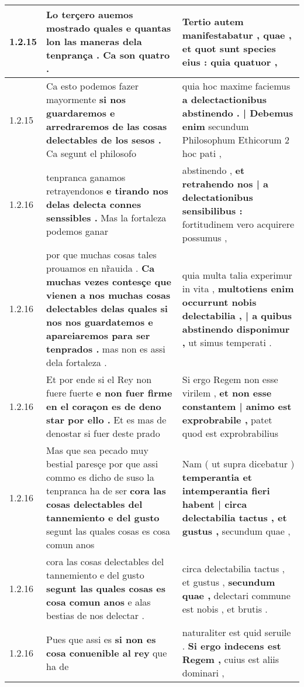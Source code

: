 \begin{tabular}{|p{1cm}|p{6.5cm}|p{6.5cm}|}
1.2.15 & Lo terçero auemos mostrado \textbf{ quales e quantas lon las maneras dela tenprança . } Ca son quatro . & Tertio autem manifestabatur , quae , \textbf{ et quot sunt species eius : } quia quatuor , \\\hline
1.2.15 & Ca esto podemos fazer mayormente \textbf{ si nos guardaremos e arredraremos de las cosas delectables de los sesos . } Ca segunt el philosofo & quia hoc maxime faciemus \textbf{ a delectactionibus abstinendo . | Debemus enim } secundum Philosophum Ethicorum 2 hoc pati , \\\hline
1.2.16 & tenpranca ganamos retrayendonos \textbf{ e tirando nos delas delecta connes senssibles . } Mas la fortaleza podemos ganar & abstinendo , \textbf{ et retrahendo nos | a delectationibus sensibilibus : } fortitudinem vero acquirere possumus , \\\hline
1.2.16 & por que muchas cosas tales prouamos en nr̃auida . \textbf{ Ca muchas vezes contesçe que vienen a nos muchas cosas delectables delas quales si nos nos guardatemos e apareiaremos para ser tenprados . } mas non es assi dela fortaleza . & quia multa talia experimur in vita , \textbf{ multotiens enim occurrunt nobis delectabilia , | a quibus abstinendo disponimur , } ut simus temperati . \\\hline
1.2.16 & Et por ende si el Rey non fuere fuerte \textbf{ e non fuer firme en el coraçon es de deno star por ello . } Et es mas de denostar si fuer deste prado & Si ergo Regem non esse virilem , \textbf{ et non esse constantem | animo est exprobrabile , } patet quod est exprobrabilius \\\hline
1.2.16 & Mas que sea pecado muy bestial paresçe por que assi commo es dicho de suso la tenpranca ha de ser \textbf{ cora las cosas delectables del tannemiento e del gusto } segunt las quales cosas es cosa comun anos & Nam ( ut supra dicebatur ) \textbf{ temperantia et intemperantia fieri habent | circa delectabilia tactus , et gustus , } secundum quae , \\\hline
1.2.16 & cora las cosas delectables del tannemiento e del gusto \textbf{ segunt las quales cosas es cosa comun anos } e alas bestias de nos delectar . & circa delectabilia tactus , et gustus , \textbf{ secundum quae , } delectari commune est nobis , et brutis . \\\hline
1.2.16 & Pues que assi es \textbf{ si non es cosa conuenible al rey } que ha de & naturaliter est quid seruile . \textbf{ Si ergo indecens est Regem , } cuius est aliis dominari , \\\hline

\end{tabular}
